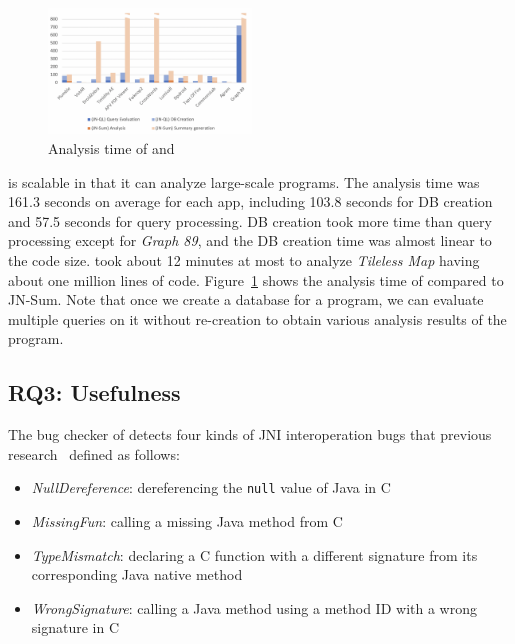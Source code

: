 \begin{figure}[t]
  \centering
  \vspace{2mm}
  \includegraphics[width=0.48\textwidth]{img/graph}
  \vspace*{-1.5em}
  \caption{Analysis time of \ours and \lees}
  \label{fig:graph}
\vspace*{-.5em}
\end{figure}

\ours is scalable in that it can analyze large-scale programs. The analysis
time was 161.3 seconds on average for each app, including 103.8 seconds
for DB creation and 57.5 seconds for query processing.  DB creation
took more time than query processing except for {\it Graph 89}, and
the DB creation time was almost linear to the code size. \ours took
about 12 minutes at most to analyze {\it Tileless Map} having about one million
lines of code. Figure~\ref{fig:graph} shows the analysis time of \ours
compared to JN-Sum.   Note
that once we create a database for a program, we can evaluate multiple queries on
it without re-creation to obtain various analysis results of the program.


\subsection{RQ3: Usefulness}

The bug checker of \ours detects four kinds of JNI interoperation bugs
that previous research~\cite{ILEA, LeeASE20} defined as follows:

\begin{itemize}
  \item {\it NullDereference}: dereferencing the {\tt null} value of Java in C
  \item {\it MissingFun}: calling a missing Java method from C
  \item {\it TypeMismatch}: declaring a C function with a different signature
    from its corresponding Java native method
  \item {\it WrongSignature}: calling a Java method using a method ID with a
    wrong signature in C
\end{itemize}


